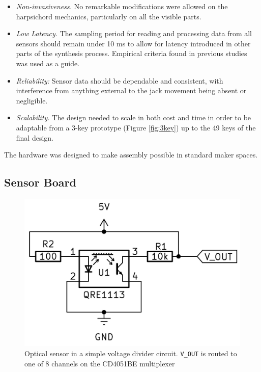 \begin{itemize}
    \item \emph{Non-invasiveness.} No remarkable modifications were allowed on the harpsichord mechanics, particularly on all the visible parts.
    \item \emph{Low Latency.} The sampling period for reading and processing data from all sensors should remain under 10 ms to allow for latency introduced in other parts of the synthesis process. Empirical criteria found in previous studies \cite{Jack2016} was used as a guide.
    \item \emph{Reliability:} Sensor data should be dependable and consistent, with interference from anything external to the jack movement being absent or negligible.
    \item \emph{Scalability.} The design needed to scale in both cost and time in order to be adaptable from a 3-key prototype (Figure \ref{fig:3key}) up to the 49 keys of the final design.
\end{itemize}

The hardware was designed to make assembly possible in standard maker spaces.  

\subsection{Sensor Board}\label{sensor-board}

\begin{figure}[!h] 
  \centering
  \includegraphics[width=0.7\linewidth,trim={0 1.5cm 0 1.5cm},clip]{src/images/simple-schematic-bw-.jpg} 
  \caption{Optical sensor in a simple voltage divider circuit. \texttt{V\_OUT} is routed to one of 8 channels on the CD4051BE multiplexer}
  \Description{} 
  \label{fig:simple-schematic}
\end{figure}

